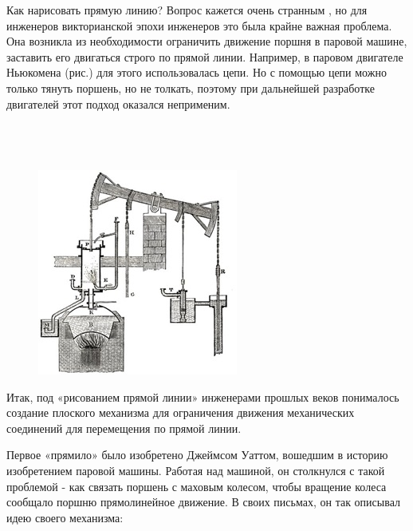 Как нарисовать прямую линию? Вопрос кажется очень странным , но для инженеров викторианской эпохи инженеров это была крайне важная  проблема. Она возникла из необходимости ограничить движение поршня в паровой машине, заставить его двигаться строго по прямой линии.  Например,  в паровом двигателе Ньюкомена (рис.) для этого использовалась цепи. Но с помощью цепи можно только тянуть поршень, но не толкать, поэтому при дальнейшей разработке двигателей этот подход оказался неприменим.\\\\

\\\\

\begin{figure}[h!]
	\begin{center}
		\includegraphics[width=0.92\linewidth]{chapters/chapter22/images/1}
		\caption{}
		\label{ris:image22x1}
	\end{center}
\end{figure}

Итак, под «рисованием прямой линии» инженерами прошлых веков понималось создание плоского механизма для ограничения  движения механических соединений для перемещения по прямой линии.

Первое «прямило» было изобретено Джеймсом Уаттом, вошедшим в историю изобретением паровой машины. Работая над машиной, он столкнулся с такой проблемой - как связать поршень с маховым колесом, чтобы вращение колеса сообщало поршню прямолинейное движение. В своих письмах, он так описывал идею своего механизма:

